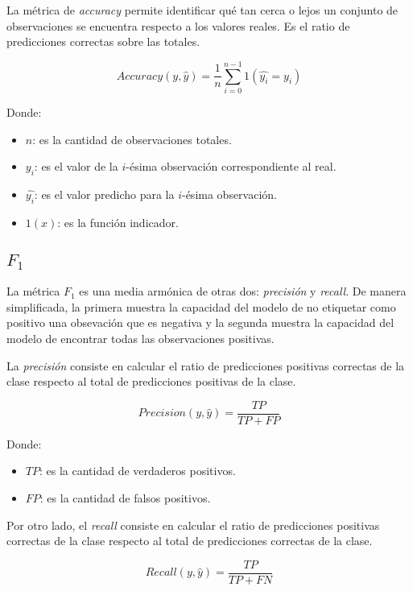 La m\'etrica de {\it accuracy} permite identificar qu\'e tan cerca o lejos un conjunto de observaciones se encuentra
respecto a los valores reales. Es el ratio de predicciones correctas sobre las totales.

\begin{equation}
    Accuracy(y, \hat{y}) = \frac{1}{n} \sum_{i=0}^{n-1} 1(\hat{y_{i}}=y_{i})
\end{equation}

Donde:
\begin{itemize}
    \item $n$: es la cantidad de observaciones totales.
    \item $y_{i}$: es el valor de la ${i}$-\'esima observaci\'on correspondiente al real.
    \item $\hat{y_{i}}$: es el valor predicho para la ${i}$-\'esima observaci\'on.
    \item $1(x)$: es la funci\'on indicador.
\end{itemize}

\subsection{$F_{1}$}

La m\'etrica $F_{1}$ es una media arm\'onica de otras dos: {\it precisi\'on} y {\it recall}. De manera simplificada, la
primera muestra la capacidad del modelo de no etiquetar como positivo una obsevaci\'on que es negativa y la segunda
muestra la capacidad del modelo de encontrar todas las observaciones positivas.

La {\it precisi\'on} consiste en calcular el ratio de predicciones positivas correctas de la clase respecto al total de
predicciones positivas de la clase.

\begin{equation}
    Precision(y, \hat{y}) = \frac{TP}{TP + FP}
\end{equation}

Donde:
\begin{itemize}
    \item $TP$: es la cantidad de verdaderos positivos.
    \item $FP$: es la cantidad de falsos positivos.
\end{itemize}

Por otro lado, el {\it recall} consiste en calcular el ratio de predicciones positivas correctas de la clase respecto
al total de predicciones correctas de la clase.

\begin{equation}
    Recall(y, \hat{y}) = \frac{TP}{TP + FN}
\end{equation}

